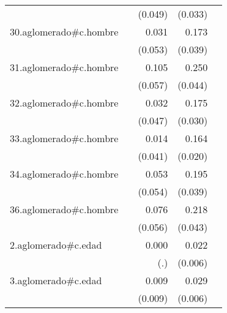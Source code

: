 {\begin{longtable}{l*{4}{D{.}{.}{-1}}}
            &                     &     (0.049)         &     (0.033)         &                     \\
\addlinespace
30.aglomerado#c.hombre&                     &       0.031         &       0.173\sym{***}&                     \\
            &                     &     (0.053)         &     (0.039)         &                     \\
\addlinespace
31.aglomerado#c.hombre&                     &       0.105         &       0.250\sym{***}&                     \\
            &                     &     (0.057)         &     (0.044)         &                     \\
\addlinespace
32.aglomerado#c.hombre&                     &       0.032         &       0.175\sym{***}&                     \\
            &                     &     (0.047)         &     (0.030)         &                     \\
\addlinespace
33.aglomerado#c.hombre&                     &       0.014         &       0.164\sym{***}&                     \\
            &                     &     (0.041)         &     (0.020)         &                     \\
\addlinespace
34.aglomerado#c.hombre&                     &       0.053         &       0.195\sym{***}&                     \\
            &                     &     (0.054)         &     (0.039)         &                     \\
\addlinespace
36.aglomerado#c.hombre&                     &       0.076         &       0.218\sym{***}&                     \\
            &                     &     (0.056)         &     (0.043)         &                     \\
\addlinespace
2.aglomerado#c.edad&                     &       0.000         &       0.022\sym{***}&                     \\
            &                     &         (.)         &     (0.006)         &                     \\
\addlinespace
3.aglomerado#c.edad&                     &       0.009         &       0.029\sym{***}&                     \\
            &                     &     (0.009)         &     (0.006)         &                     \\

\end{longtable}}
